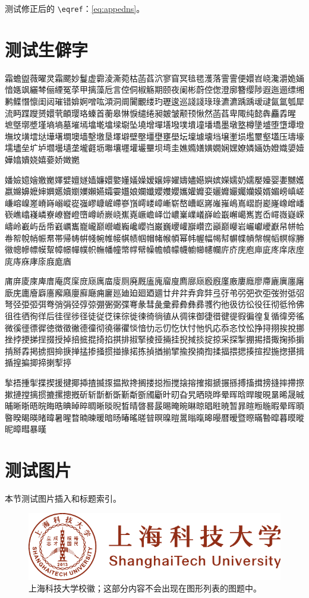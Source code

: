 \documentclass[
  fontset = mac,
]{shtthesis}
\begin{document}
测试修正后的 \verb|\eqref|：\eqref{eq:appedns}。

\section{测试生僻字}
{\songti 霜蟾盥薇曜灵霜颸妙鬘虚霩淩澌菀枯菡萏泬寥窅冥毰毸濩落霅霅便嬛岧峣瀺灂姽婳愔嫕飒纚棽俪緸冤莩甲摛藻卮言倥侗椒觞期颐夜阑彬蔚倥偬澄廓簪缨陟遐迤逦缥缃鹣鲽憯懔闺闼璀错媕婀噌吰澒洞阛闠覼缕玓瓑逡巡諓諓琭琭瀌瀌踽踽叆叇氤氲瓠犀流眄蹀躞赟嬛茕頔璎珞螓首蘅皋惏悷缱绻昶皴皱颟顸愀然菡萏卑陬纯懿犇麤掱暒 墌墍墎墏墐墒墒墓墔墕墖墘墖墚墛坠墝增墠墡墢墣墤墥墦墧墨墩墪樽墬墭堕墯墰墱墲坟墴墵垯墷墸墹墺墙墼墽垦墿壀壁壂壃壄壅壆坛壈壉壊垱壌壍埙壏壐壑壒压壔壕壖壗垒圹垆壛壜壝垄壠壡坜壣壤壥壦壧壨坝塆圭嫶嫷嫸嫹嫺娴嫼嫽嫾婳妫嬁嬂嬃嬄嬅嬆嬇娆嬉嬊娇嬍嬎}

{\heiti 嬏嬐嬑嬒嬓嬔嬕嬖嬗嬘嫱嬚嬛嬜嬞嬟嬠嫒嬢嬣嬥嬦嬧嬨嬩嫔嬫嬬奶嬬嬮嬯婴嬱嬲嬳嬴嬵嬶嬷婶嬹嬺嬻嬼嬽嬾嬿孀孁孂娘孄孅孆孇孆孈孉孊娈孋孊孍孎孏嫫婿媚嵭嵮嵯嵰嵱嵲嵳嵴嵵嵶嵷嵸嵹嵺嵻嵼嵽嵾嵿嶀嵝嶂嶃崭嶅嶆岖嶈嶉嶊嶋嶌嶍嶎嶏嶐嶑嶒嶓嵚嶕嶖嶘嶙嶚嶛嶜嶝嶞嶟峤嶡峣嶣嶤嶥嶦峄峃嶩嶪嶫嶬嶭崄嶯嶰嶱嶲嶳岙嶵嶶嶷嵘嶹岭嶻屿岳帋巀巁巂巃巄巅巆巇巈巉巊岿巌巍巎巏巐巑峦巓巅巕岩巗巘巙巚帠帡帢帣帤帨帩帪帬帯帰帱帲帴帵帷帹帺帻帼帽帾帿幁幂帏幄幅幆幇幈幉幊幋幌幍幎幏幐幑幒幓幖幙幚幛幜幝幞帜幠幡幢幤幥幦幧幨幩幪幭幮幯幰幱庍庎庑庖庘庛庝庠庡庢庣庤庥庨庩庪庬庮}

{\kaishu 庯庰庱庲庳庴庵庹庺庻庼庽庿廀厕廃厩廅廆廇廋廌廍庼廏廐廑廒廔廕廖廗廘廙廛廜廞庑廤廥廦廧廨廭廮廯廰痈廲廵廸廹廻廼廽廿弁弅弆弇弉弖弙弚弜弝弞弡弢弣弤弨弩弪弫弬弭弮弰弲弪弴弶弸弻弼弽弿彖彗彘彚彛彜彝彞彟彴彵彶彷彸役彺彻彽彾佛徂徃徆徇徉后徍徎徏径徒従徔徕徖徙徚徛徜徝从徟徕御徢徣徤徥徦徧徨复循徫旁徭微徯徰徱徲徳徴徵徶德徸彻徺忁忂惔愔忇忈忉忔忕忖忚忛応忝忞忟忪挣挦挧挨挩挪挫挬挭挮挰掇授掉掊掋掍掎掐掑排掓掔掕挜掚挂掜掝掞掟掠采探掣掤掦措掫掬掭掮掯掰掱掲掳掴掵掶掸掹掺掻掼掽掾掿拣揁揂揃揅揄揆揇揈揉揊揋揌揍揎揑揓揔揕揖揗揘揙揤揥揦揧揨}

{\fangsong 揫捂揰揱揲揳援揵揶揷揸揻揼揾揿搀搁搂搃搄搅搇搈搉搊搋搌搎搏搐搑搒摓摔摕摖摗摙摚摛掼摝摞摠摡斫斩斮斱斲斳斴斵斶斸旪旫旮旯晒晓晔晕晖晗晘晙晛晜晞晟晠晡晰晣晤晥晦晧晪晫晬晭晰晱晲晳晴晵晷晸晹晻晼晽晾晿暀暁暂暃暄暅暆暇晕晖暊暋暌暍暎暏暐暑暒暓暔暕暖暗旸暙暚暛暜暝暞暟暠暡暣暤暥暦暧暨暩暪暬暭暮暯暰昵暲暳暴暵}

\section{测试图片}
本节测试图片插入和标题索引。

\begin{figure}[htb]
  \centering
  \includegraphics[width=0.75\columnwidth]{shanghaitech_logo.pdf}
  \caption[上海科技大学校徽]{上海科技大学校徽；这部分内容不会出现在图形列表的图题中。}
\end{figure}
\end{document}
